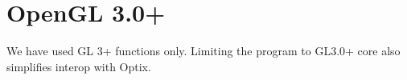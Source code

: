 \section{OpenGL 3.0+}

We have used GL 3+ functions only. Limiting the program to GL3.0+ core also simplifies interop with Optix.